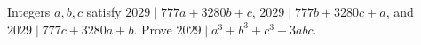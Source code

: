 Integers $a,b,c$ satisfy $2029\mid777a+3280b+c$, $2029\mid777b+3280c+a$, and $2029\mid777c+3280a+b$. Prove $2029\mid a^3+b^3+c^3-3abc$.
